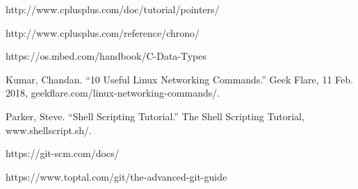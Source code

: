 {\footnotesize
\begin{thebibliography}{99}
	 http://www.cplusplus.com/doc/tutorial/pointers/
	
	 http://www.cplusplus.com/reference/chrono/
	
	 https://os.mbed.com/handbook/C-Data-Types
	
	 Kumar, Chandan. “10 Useful Linux Networking Commands.” Geek Flare, 11 Feb. 2018, geekflare.com/linux-networking-commands/. 
	
	  Parker, Steve. “Shell Scripting Tutorial.” The Shell Scripting Tutorial, www.shellscript.sh/. 
	
	 https://git-scm.com/docs/
	
	 https://www.toptal.com/git/the-advanced-git-guide
\end{thebibliography}
}

